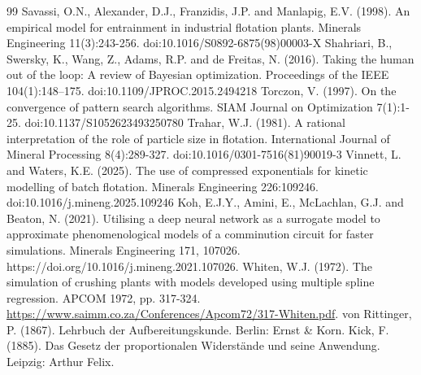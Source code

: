 \documentclass[10pt]{article}
\begin{document}
\begin{thebibliography}{99}
 Savassi, O.N., Alexander, D.J., Franzidis, J.P. and Manlapig, E.V. (1998). An empirical model for entrainment in industrial flotation plants. Minerals Engineering 11(3):243-256. doi:10.1016/S0892-6875(98)00003-X
 Shahriari, B., Swersky, K., Wang, Z., Adams, R.P. and de Freitas, N. (2016). Taking the human out of the loop: A review of Bayesian optimization. Proceedings of the IEEE 104(1):148--175. doi:10.1109/JPROC.2015.2494218
 Torczon, V. (1997). On the convergence of pattern search algorithms. SIAM Journal on Optimization 7(1):1-25. doi:10.1137/S1052623493250780
 Trahar, W.J. (1981). A rational interpretation of the role of particle size in flotation. International Journal of Mineral Processing 8(4):289-327. doi:10.1016/0301-7516(81)90019-3
 Vinnett, L. and Waters, K.E. (2025). The use of compressed exponentials for kinetic modelling of batch flotation. Minerals Engineering 226:109246. doi:10.1016/j.mineng.2025.109246
 Koh, E.J.Y., Amini, E., McLachlan, G.J. and Beaton, N. (2021). Utilising a deep neural network as a surrogate model to approximate phenomenological models of a comminution circuit for faster simulations. Minerals Engineering 171, 107026. https://doi.org/10.1016/j.mineng.2021.107026.
 Whiten, W.J. (1972). The simulation of crushing plants with models developed using multiple spline regression. APCOM 1972, pp. 317-324. \url{https://www.saimm.co.za/Conferences/Apcom72/317-Whiten.pdf}.
 von Rittinger, P. (1867). Lehrbuch der Aufbereitungskunde. Berlin: Ernst \& Korn.
 Kick, F. (1885). Das Gesetz der proportionalen Widerstände und seine Anwendung. Leipzig: Arthur Felix.
\end{thebibliography}
\endgroup
\end{document}
